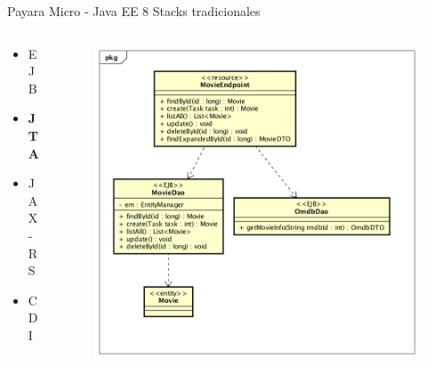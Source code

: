 \documentclass{beamer}
\begin{document}
\begin{frame}{Payara Micro - Java EE 8}
Stacks tradicionales
\begin{columns}[T] %
\begin{column}[T]{3cm} %
	\begin{itemize}
		\item EJB
		\item \textbf{JTA}
		\item JAX-RS
		\item CDI
	\end{itemize}
\end{column}
\begin{column}[T]{7cm} %
	\begin{figure}
		\centering
		\includegraphics[width=\linewidth]{Images/democlass}
	\end{figure}
\end{column}
\end{columns}
\end{frame}
\end{document}
